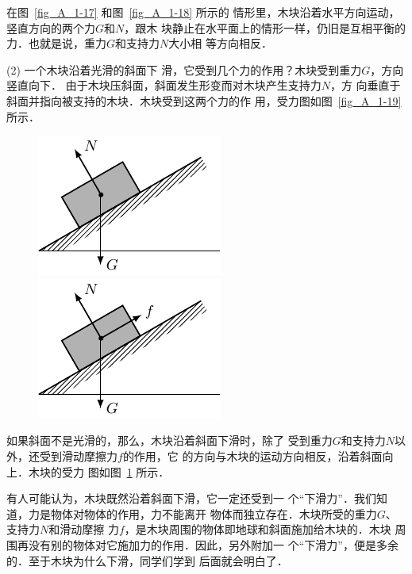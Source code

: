    在图~\ref{fig_A_1-17} 和图~\ref{fig_A_1-18} 所示的
情形里，木块沿着水平方向运动，
竖直方向的两个力$G$和$N$，跟木
块静止在水平面上的情形一样，仍旧是互相平衡的力．也就是说，重力$G$和支持力$N$大小相
等方向相反．


    (2)   一个木块沿着光滑的斜面下
滑，它受到几个力的作用？木块受到重力$G$，方向竖直向下．
由于木块压斜面，斜面发生形变而对木块产生支持力$N$，方
向垂直于斜面并指向被支持的木块．木块受到这两个力的作
用，受力图如图~\ref{fig_A_1-19} 所示．

\begin{figure}[htbp]
    \centering
    \begin{minipage}[b]{0.48\textwidth} 
        \centering
        \includegraphics{fig/A/1-19.pdf} 
        \caption{} \label{fig_A_1-19} 
    \end{minipage} 
    \begin{minipage}[b]{0.48\textwidth} 
        \centering
        \includegraphics{fig/A/1-20.pdf} 
        \caption{} \label{fig_A_1-20} 
    \end{minipage} 
\end{figure} 


    如果斜面不是光滑的，那么，木块沿着斜面下滑时，除了
受到重力$G$和支持力$N$以外，还受到滑动摩擦力$f$的作用，它
的方向与木块的运动方向相反，沿着斜面向上．木块的受力
图如图~\ref{fig_A_1-20} 所示．


有人可能认为，木块既然沿着斜面下滑，它一定还受到一
个“下滑力”．我们知道，力是物体对物体的作用，力不能离开
物体而独立存在．木块所受的重力$G$、支持力$N$和滑动摩擦
力$f$，是木块周围的物体即地球和斜面施加给木块的．木块
周围再没有别的物体对它施加力的作用．因此，另外附加一
个“下滑力”，便是多余的．至于木块为什么下滑，同学们学到
后面就会明白了．

